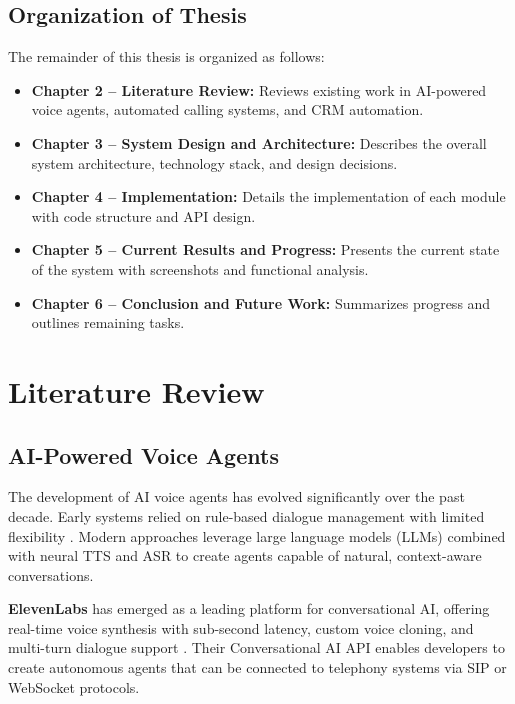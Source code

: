 \documentclass[12pt,a4paper,oneside]{book}
\begin{document}
\section{Organization of Thesis}

The remainder of this thesis is organized as follows:

\begin{itemize}
    \item \textbf{Chapter 2 -- Literature Review:} Reviews existing work in AI-powered voice agents, automated calling systems, and CRM automation.
    \item \textbf{Chapter 3 -- System Design and Architecture:} Describes the overall system architecture, technology stack, and design decisions.
    \item \textbf{Chapter 4 -- Implementation:} Details the implementation of each module with code structure and API design.
    \item \textbf{Chapter 5 -- Current Results and Progress:} Presents the current state of the system with screenshots and functional analysis.
    \item \textbf{Chapter 6 -- Conclusion and Future Work:} Summarizes progress and outlines remaining tasks.
\end{itemize}


\chapter{Literature Review}

\section{AI-Powered Voice Agents}

The development of AI voice agents has evolved significantly over the past decade. Early systems relied on rule-based dialogue management with limited flexibility \citep{jurafsky2023speech}. Modern approaches leverage large language models (LLMs) combined with neural TTS and ASR to create agents capable of natural, context-aware conversations.

\textbf{ElevenLabs} has emerged as a leading platform for conversational AI, offering real-time voice synthesis with sub-second latency, custom voice cloning, and multi-turn dialogue support \citep{elevenlabs2024}. Their Conversational AI API enables developers to create autonomous agents that can be connected to telephony systems via SIP or WebSocket protocols.
\end{document}
